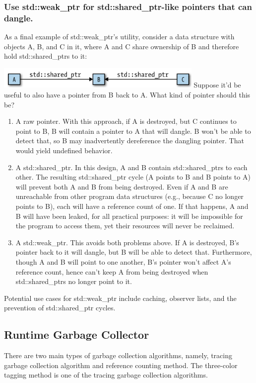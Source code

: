 \documentclass[a4paper]{article}
\theoremstyle{definition}
\begin{document}
\subsubsection{Use std::weak\_ptr for std::shared\_ptr-like pointers that can dangle.}

As a final example of std::weak\_ptr’s utility, consider a data structure with objects A, B, and C in it, where A and C share ownership of B and therefore hold std::shared\_ptrs to it:

\includegraphics[width=10cm]{img/Snipaste_2021-05-26_14-32-03.png}
Suppose it’d be useful to also have a pointer from B back to A. What kind of pointer should this be?
\begin{enumerate}
  \item A raw pointer. With this approach, if A is destroyed, but C continues to point to B, B will contain a pointer to A that will dangle. B won’t be able to detect that, so B may inadvertently dereference the dangling pointer. That would yield undefined behavior.

  \item A std::shared\_ptr. In this design, A and B contain std::shared\_ptrs to each other. The resulting std::shared\_ptr cycle (A points to B and B points to A) will prevent both A and B from being destroyed. Even if A and B are unreachable from other program data structures (e.g., because C no longer points to B), each will have a reference count of one. If that happens, A and B will have been leaked, for all practical purposes: it will be impossible for the program to access them, yet their resources will never be reclaimed.
  
  \item A std::weak\_ptr. This avoids both problems above. If A is destroyed, B’s pointer back to it will dangle, but B will be able to detect that. Furthermore, though A and B will point to one another, B’s pointer won’t affect A’s reference count, hence can’t keep A from being destroyed when std::shared\_ptrs no longer point to it.
\end{enumerate}
Potential use cases for std::weak\_ptr include caching, observer lists, and the prevention of std::shared\_ptr cycles.
\subsection{Runtime Garbage Collector}
There are two main types of garbage collection algorithms, namely, tracing garbage collection algorithm and reference counting method. The three-color tagging method is one of the tracing garbage collection algorithms.
\end{document}

